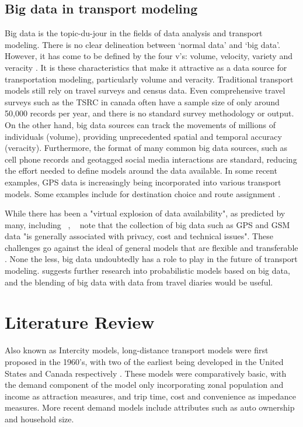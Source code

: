 \section{Big data in transport modeling}
Big data is the topic-du-jour in the fields of data analysis and transport modeling. There is no clear delineation between `normal data' and `big data'. However, it has come to be defined by the four v's: volume, velocity, variety and veracity \parencite{beyer2012importance}. It is these characteristics that make it attractive as a data source for transportation modeling, particularly volume and veracity. Traditional transport models still rely on travel surveys and census data. Even comprehensive travel surveys such as the TSRC in canada  often have a sample size of only around 50,000 records per year, and there is no standard survey methodology or output. On the other hand, big data sources can track the movements of millions of individuals (volume), providing unprecedented spatial and temporal accuracy (veracity). Furthermore, the format of many common big data sources, such as cell phone records and geotagged social media interactions are standard, reducing the effort needed to define models around the data available. In some recent examples, GPS data is increasingly being incorporated into various transport models. Some examples include for destination choice \parencite{schonfelder2006analysis, pan2006cellular} and route assignment \parencite{broach2012cyclists, menghini2010route}.

While there has been a "virtual explosion of data availability", as predicted by many, including ~\textcite{nagel2001workshop},  ~\textcite{horni2012improve} note that  the collection of big data such as GPS and GSM data "is generally associated with privacy, cost and technical issues".  These challenges go against the ideal of general models that are flexible and transferable \parencite{patriksson2015traffic}. None the less, big data undoubtedly has a role to play in the future of transport modeling. \textcite{rth2015} suggests further research into probabilistic models based on big data, and the blending of big data with data from travel diaries would be useful. 

\chapter{Literature Review}
\label{section:lit-review}
Also known as Intercity models, long-distance transport models were first proposed in the 1960’s, with two of the earliest being developed in the United States and Canada respectively \parencite{CTC71}. These models were comparatively basic, with the demand component of the model only incorporating zonal population and income as attraction measures, and trip time, cost and convenience as impedance measures. More recent demand models include attributes such as auto ownership and household size. 

